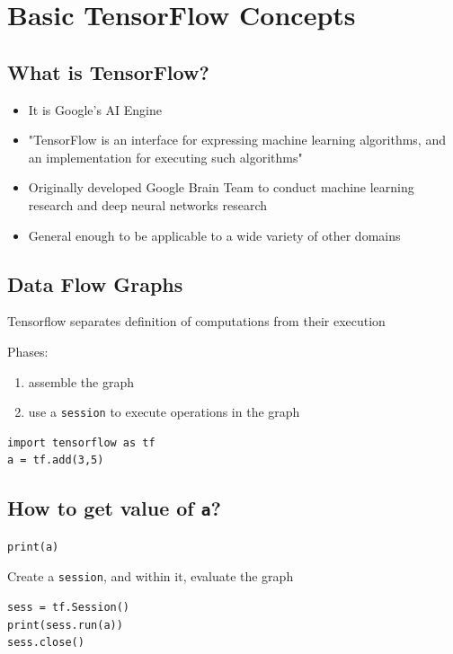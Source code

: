 \documentclass[11pt]{article}
\begin{document}
\section*{Basic TensorFlow Concepts}
\label{sec:orgcfc25cb}
\subsection*{What is TensorFlow?}
\label{sec:org6fec455}
\begin{itemize}
\item It is Google's AI Engine
\item "TensorFlow is an interface for expressing machine learning algorithms, and an implementation for executing such algorithms"
\item Originally developed Google Brain Team to conduct machine learning research and deep neural networks research
\item General enough to be applicable to a wide variety of other domains
\end{itemize}
\subsection*{Data Flow Graphs}
\label{sec:orgb9d4191}
Tensorflow separates definition of computations from their execution

Phases:
\begin{enumerate}
\item assemble the graph
\item use a \texttt{session} to execute operations in the graph
\end{enumerate}

\begin{verbatim}
import tensorflow as tf
a = tf.add(3,5)
\end{verbatim}

\subsection*{How to get value of \texttt{a}?}
\label{sec:org2014023}
\begin{verbatim}
print(a)
\end{verbatim}

Create a \texttt{session}, and within it, evaluate the graph

\begin{verbatim}
sess = tf.Session()
print(sess.run(a))
sess.close()
\end{verbatim}
\end{document}
